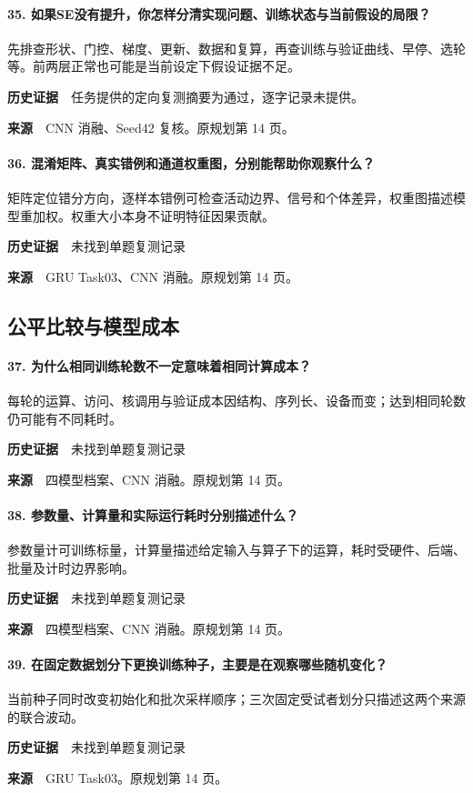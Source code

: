 \paragraph{35. 如果SE没有提升，你怎样分清实现问题、训练状态与当前假设的局限？}
先排查形状、门控、梯度、更新、数据和复算，再查训练与验证曲线、早停、选轮等。前两层正常也可能是当前设定下假设证据不足。\par
\textbf{历史证据}　任务提供的定向复测摘要为通过，逐字记录未提供。\par
\textbf{来源}　CNN 消融、Seed42 复核。原规划第 14 页。\par
\paragraph{36. 混淆矩阵、真实错例和通道权重图，分别能帮助你观察什么？}
矩阵定位错分方向，逐样本错例可检查活动边界、信号和个体差异，权重图描述模型重加权。权重大小本身不证明特征因果贡献。\par
\textbf{历史证据}　未找到单题复测记录\par
\textbf{来源}　GRU Task03、CNN 消融。原规划第 14 页。\par
\clearpage\subsection{公平比较与模型成本}
\paragraph{37. 为什么相同训练轮数不一定意味着相同计算成本？}
每轮的运算、访问、核调用与验证成本因结构、序列长、设备而变；达到相同轮数仍可能有不同耗时。\par
\textbf{历史证据}　未找到单题复测记录\par
\textbf{来源}　四模型档案、CNN 消融。原规划第 14 页。\par
\paragraph{38. 参数量、计算量和实际运行耗时分别描述什么？}
参数量计可训练标量，计算量描述给定输入与算子下的运算，耗时受硬件、后端、批量及计时边界影响。\par
\textbf{历史证据}　未找到单题复测记录\par
\textbf{来源}　四模型档案、CNN 消融。原规划第 14 页。\par
\paragraph{39. 在固定数据划分下更换训练种子，主要是在观察哪些随机变化？}
当前种子同时改变初始化和批次采样顺序；三次固定受试者划分只描述这两个来源的联合波动。\par
\textbf{历史证据}　未找到单题复测记录\par
\textbf{来源}　GRU Task03。原规划第 14 页。\par
